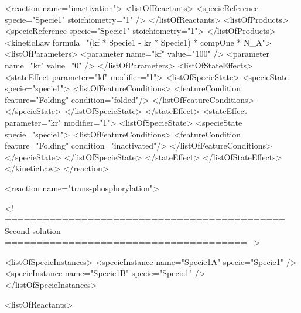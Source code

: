 \documentclass{cekarticle}
\newenvironment{changemargin}[2]{\begin{list}{}{%
\setlength{\leftmargin}{0pt}%
\setlength{\rightmargin}{0pt}%
\setlength{\listparindent}{\parindent}%
\setlength{\itemindent}{\parindent}%
\addtolength{\leftmargin}{#1}%
\addtolength{\rightmargin}{#2}%
}\item }{\end{list}}
\begin{document}
\begin{changemargin}{-2cm}{0cm}
\begin{example}
                <reaction name="inactivation">
                    <listOfReactants>
                        <specieReference specie="Specie1" stoichiometry="1" />
                    </listOfReactants>
                    <listOfProducts>
                        <specieReference specie="Specie1" stoichiometry="1">
                    </listOfProducts>
                    <kineticLaw formula="(kf * Specie1 - kr * Specie1) * compOne * N_A">
                        <listOfParameters>
                            <parameter name="kf" value="100" />
                            <parameter name="kr" value="0" />
                        </listOfParameters>
                        <listOfStateEffects>
                            <stateEffect parameter="kf" modifier="1">
                                <listOfSpecieState>
                                    <specieState specie="specie1">
                                        <listOfFeatureConditions>
                                            <featureCondition feature="Folding" condition="folded"/>
                                        </listOfFeatureConditions>
                                    </specieState>
                                </listOfSpecieState>
                            </stateEffect>  
                            <stateEffect parameter="kr" modifier="1">
                                <listOfSpecieState>
                                    <specieState specie="specie1">
                                        <listOfFeatureConditions>
                                            <featureCondition feature="Folding" condition="inactivated"/>
                                        </listOfFeatureConditions>
                                    </specieState>
                                </listOfSpecieState>
                            </stateEffect>  
                        </listOfStateEffects>
                    </kineticLaw>
                </reaction>

                <reaction name="trans-phosphorylation">

<!-- ============================================ Second solution ====================================== -->

                    <listOfSpecieInstances>           
                        <specieInstance name="Specie1A" specie="Specie1" />
                        <specieInstance name="Specie1B" specie="Specie1" />
                    </listOfSpecieInstances>

                    <listOfReactants>


\end{example}
\end{changemargin}
\end{document}
